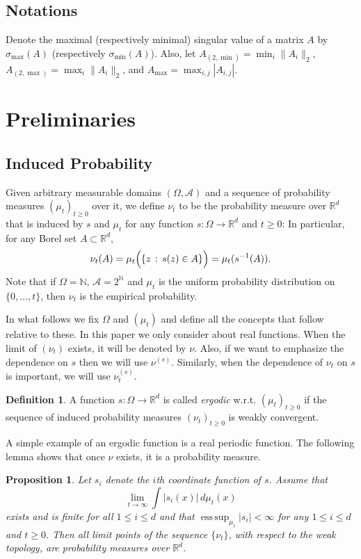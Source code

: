 \documentclass[twoside]{article}
\newcommand{\scom}[1]{s_{#1}}
\newcommand{\cset}[2]{\left\{#1\,:\,#2\right\}}
\newcommand{\ra}{\rightarrow}
\newcommand{\real}{\mathbb{R}}
\DeclareMathOperator{\esssup}{ess\,sup}
\renewcommand{\natural}{\mathbb{N}}
\newtheorem{prop}[lemma]{Proposition}
\theoremstyle{definition}
\newtheorem{definition}[lemma]{Definition}
\renewcommand{\AA}{\mathcal{A}}
\begin{document}
\subsection{Notations}
Denote the maximal (respectively minimal) singular value of a matrix $A$ by  $\sigma_{\max}(A)$ (respectively $\sigma_{\min}(A)$). Also, let $A_{(2,\min)} = \min_{i} \|A_i\|_2$, $A_{(2,\max)} = \max_{i} \|A_i\|_2$, and $A_{\max} = \max_{i,j} |A_{i,j}|$.

\section{Preliminaries}
\label{sec:Preliminaries}
\subsection{Induced Probability}
\label{subsec:InducesProb}
Given arbitrary measurable domains $(\Omega,\AA)$ and a sequence of probability measures $(\mu_t)_{t\ge0}$ over it, we define $\nu_t$ to be the probability measure over $\real^d$ that is induced by $s$ and $\mu_t$ for any function $s: \Omega \ra \real^d$ and $t\ge 0$:
In particular, for any Borel set $A\subset \real^d$,
\[
\nu_t(A)= \mu_t\Bigl( \cset{z}{s(z)\in A} \Bigr)
= \mu_t ( s^{-1}(A) ).
\]
Note that if $\Omega = \natural$, $\AA = 2^\natural$ and $\mu_t$ is the uniform probability distribution on $\{0,\ldots,t\}$, then $\nu_t$ is the empirical probability.

In what follows we fix $\Omega$ and $(\mu_t)$ and define all the concepts that follow relative to these. 
In this paper we only consider about real functions.
When the limit of $(\nu_t)$ exists, it will be denoted by $\nu$.
Also, if we want to emphasize the dependence on $s$ then we will use $\nu^{(s)}$.
Similarly, when the dependence of $\nu_t$ on $s$ is important, we will use $\nu^{(s)}_t$.
\begin{definition}
A function $s:\Omega \rightarrow \real^d$ is called \emph{ergodic} w.r.t. $(\mu_t)_{t\ge0}$
if the sequence of  induced probability measures $(\nu_t)_{t\ge 0}$ is weakly convergent.
\end{definition}
A simple example of an ergodic function is a real periodic function.
The following lemma shows that once $\nu$ exists, it is a probability measure. 
\begin{prop}
\label{lem:ergodicfunction}
Let $\scom{i}$ denote the $i$th coordinate function of $s$. Assume that
\[
\lim_{t\to\infty} \int |\scom{i}(x)|\, d\mu_t(x) 
\]
exists and is finite for all $1 \le i \le d$ and that $\esssup_{\mu_t} |\scom{i}|<\infty$ for any $1\le i \le d$ and $t\ge 0$.
Then all limit points of the sequence $\{\nu_t\}$, with respect to the weak topology, are probability measures over $\real^d$.
\end{prop}
\end{document}
